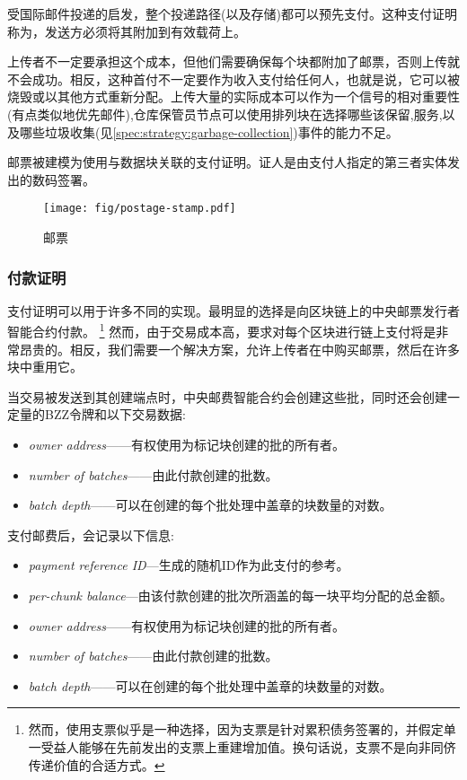 受国际邮件投递的启发，整个投递路径(以及存储)都可以预先支付。这种支付证明称为，发送方必须将其附加到有效载荷上。

上传者不一定要承担这个成本，但他们需要确保每个块都附加了邮票，否则上传就不会成功。相反，这种首付不一定要作为收入支付给任何人，也就是说，它可以被烧毁或以其他方式重新分配。上传大量的实际成本可以作为一个信号的相对重要性(有点类似地优先邮件),仓库保管员节点可以使用排列块在选择哪些该保留,服务,以及哪些垃圾收集(见\ref{spec:strategy:garbage-collection})事件的能力不足。

邮票被建模为使用与数据块关联的支付证明。证人是由支付人指定的第三者实体发出的数码签署。


\begin{figure}[htbp]
\centering
  \texttt{[image: fig/postage-stamp.pdf]}
\caption[邮票\statusgreen]{邮票}
\label{fig:postage-stamps}
\end{figure}

\subsubsection{付款证明}

支付证明可以用于许多不同的实现。最明显的选择是向区块链上的中央邮票发行者智能合约付款。%
%
\footnote{然而，使用支票似乎是一种选择，因为支票是针对累积债务签署的，并假定单一受益人能够在先前发出的支票上重建增加值。换句话说，支票不是向非同侪传递价值的合适方式。}
%
然而，由于交易成本高，要求对每个区块进行链上支付将是非常昂贵的。相反，我们需要一个解决方案，允许上传者在中购买邮票，然后在许多块中重用它。 


当交易被发送到其创建端点时，中央邮费智能合约会创建这些批，同时还会创建一定量的BZZ令牌和以下交易数据:

\begin{itemize}
\item \emph{owner address}——有权使用为标记块创建的批的所有者。
\item \emph{number of batches}——由此付款创建的批数。
\item \emph{batch depth}——可以在创建的每个批处理中盖章的块数量的对数。
\end{itemize}

支付邮费后，会记录以下信息:

\begin{itemize}
\item \emph{payment reference ID}—生成的随机ID作为此支付的参考。
\item \emph{per-chunk balance}—由该付款创建的批次所涵盖的每一块平均分配的总金额。
\item \emph{owner address}——有权使用为标记块创建的批的所有者。
\item \emph{number of batches}——由此付款创建的批数。
\item \emph{batch depth}——可以在创建的每个批处理中盖章的块数量的对数。
\end{itemize}


